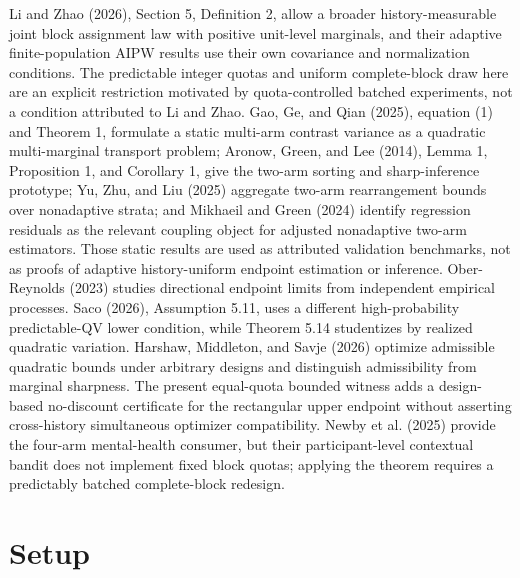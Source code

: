 \documentclass{article}
\begin{document}
Li and Zhao (2026), Section 5, Definition 2, allow a broader history-measurable joint block assignment law with positive unit-level marginals, and their adaptive finite-population AIPW results use their own covariance and normalization conditions.  The predictable integer quotas and uniform complete-block draw here are an explicit restriction motivated by quota-controlled batched experiments, not a condition attributed to Li and Zhao.  Gao, Ge, and Qian (2025), equation (1) and Theorem 1, formulate a static multi-arm contrast variance as a quadratic multi-marginal transport problem; Aronow, Green, and Lee (2014), Lemma 1, Proposition 1, and Corollary 1, give the two-arm sorting and sharp-inference prototype; Yu, Zhu, and Liu (2025) aggregate two-arm rearrangement bounds over nonadaptive strata; and Mikhaeil and Green (2024) identify regression residuals as the relevant coupling object for adjusted nonadaptive two-arm estimators.  Those static results are used as attributed validation benchmarks, not as proofs of adaptive history-uniform endpoint estimation or inference.  Ober-Reynolds (2023) studies directional endpoint limits from independent empirical processes.  Saco (2026), Assumption 5.11, uses a different high-probability predictable-QV lower condition, while Theorem 5.14 studentizes by realized quadratic variation.  Harshaw, Middleton, and Savje (2026) optimize admissible quadratic bounds under arbitrary designs and distinguish admissibility from marginal sharpness.  The present equal-quota bounded witness adds a design-based no-discount certificate for the rectangular upper endpoint without asserting cross-history simultaneous optimizer compatibility.  Newby et al. (2025) provide the four-arm mental-health consumer, but their participant-level contextual bandit does not implement fixed block quotas; applying the theorem requires a predictably batched complete-block redesign.

\section{Setup}
\end{document}
